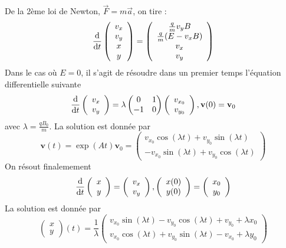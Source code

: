 \documentclass[12pt,twoside]{article}
\def \be {\begin{equation}}
\def \ee {\end{equation}}
\def \dd  {{\rm d}}
\begin{document}
De la 2ème loi de Newton, $\vec{F}=m\vec{a}$, on tire :
\be
\frac{\dd }{\dd t} 
\left( \begin{array}{c} v_x \\ v_y \\ x \\ y \end{array} \right)
=
\left( \begin{array}{c}
   \frac{q}{m} v_y B\\ \frac{q}{m} (E-v_x B) \\ 
   v_x \\ v_y
\end{array} \right)
\ee
Dans le cas où $E=0$, il s'agit de résoudre dans un premier temps l'équation differentielle suivante 
\be
\frac{\dd }{\dd t} 
\left( \begin{array}{c} v_x \\ v_y \end{array} \right)
=
\lambda
\left( \begin{matrix}
 0 & 1 \\
 -1 & 0
\end{matrix} \right)
\left( \begin{array}{c}
   v_{x_0} \\ v_{y_0}
\end{array} \right),
\textbf{v}(0) = \textbf{v}_0
\ee
avec $\lambda=\frac{qB_0}{m}$.
La solution est donnée par 
\be
\textbf{v}(t)=\exp(At) \textbf{v}_0=
\left( \begin{array}{c}
   v_{x_0}  \cos (\lambda t) + v_{y_0} \sin (\lambda t) \\
   -v_{x_0} \sin (\lambda t) + v_{y_0} \cos (\lambda t)
\end{array} \right)
\ee
On résout finalemement 
\be
\frac{\dd }{\dd t} 
\left( \begin{array}{c} x \\ y \end{array} \right)
=
\left( \begin{array}{c} v_x \\ v_y \end{array} \right) , 
\left( \begin{array}{c} x(0) \\ y(0) \end{array} \right)
=
\left( \begin{array}{c}  x_0 \\ y_0 \end{array} \right) 
\ee
La solution est donnée par 
\be
\left( \begin{array}{c} x \\ y \end{array} \right) (t)
=
\frac{1}{\lambda} \left( \begin{array}{c}
   v_{x_0}  \sin (\lambda t) - v_{y_0} \cos (\lambda t) + v_{y_0} + \lambda x_0 \\
   v_{x_0} \cos (\lambda t) + v_{y_0} \sin (\lambda t) - v_{x_0} + \lambda y_0
\end{array} \right) 
\ee
\end{document}
